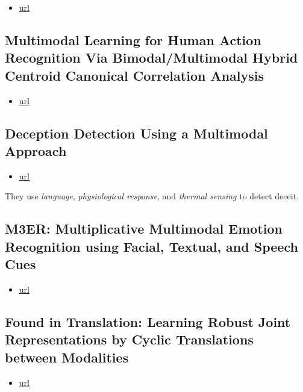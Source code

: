 \documentclass[11pt]{article}
\begin{document}
\begin{itemize}
\item \href{https://aclanthology.org/2020.coling-main.93.pdf}{url}
\end{itemize}

\subsection{Multimodal Learning for Human Action Recognition Via Bimodal/Multimodal Hybrid Centroid Canonical Correlation Analysis}

\begin{itemize}
\item \href{https://ieeexplore.ieee.org/document/8489981}{url}
\end{itemize}

\subsection{Deception Detection Using a Multimodal Approach}

\begin{itemize}
\item \href{https://dl.acm.org/doi/pdf/10.1145/2663204.2663229?casa\_token=KneK7B7xvLwAAAAA:Ajz0N96ygq8ktwkz0IVUqTt8NozCg2wR6n\_x2xntdHqZBh6VXW\_8VbO4GeY4VvMsDJlMwzkhVXQSJA}{url}
\end{itemize}
They use \textit{language}, \textit{physiological response}, and \textit{thermal sensing} to detect deceit.

\subsection{M3ER: Multiplicative Multimodal Emotion Recognition using Facial, Textual, and Speech Cues}

\begin{itemize}
\item \href{https://ojs.aaai.org/index.php/AAAI/article/view/5492}{url}
\end{itemize}

\subsection{Found in Translation: Learning Robust Joint Representations by Cyclic Translations between Modalities}

\begin{itemize}
\item \href{https://ojs.aaai.org/index.php/AAAI/article/view/4666}{url}
\end{itemize}
\end{document}
